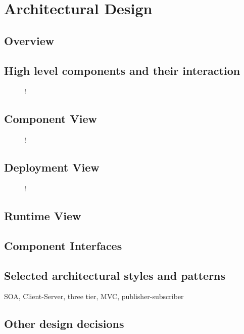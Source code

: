 \section{Architectural Design}
\subsection{Overview}
\subsection{High level components and their interaction}
\begin{figure}[H]
	\centering
	\resizebox{6in}
	{!}{}
\end{figure}
\subsection{Component View}
\begin{figure}[H]
	\centering
	\resizebox{6in}
	{!}{}
\end{figure}
\subsection{Deployment View}
\begin{figure}[H]
	\centering
	\resizebox{6in}
	{!}{}
\end{figure}
\subsection{Runtime View}
\subsection{Component Interfaces}
\subsection{Selected architectural styles and patterns}
SOA, Client-Server, three tier, MVC, publisher-subscriber
\subsection{Other design decisions}